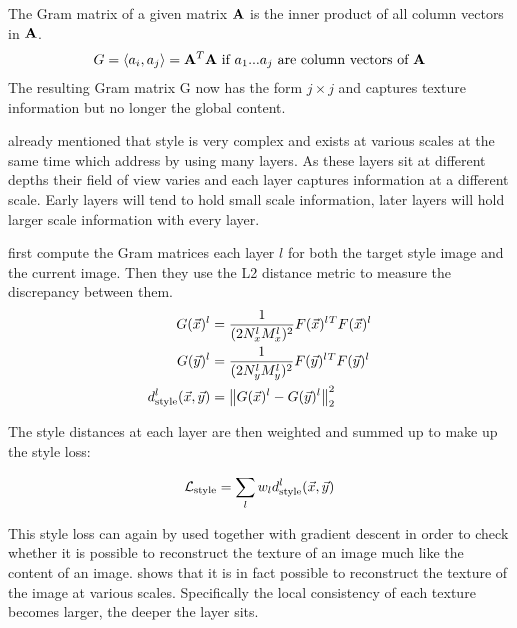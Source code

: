 The Gram matrix of a given matrix $\mathbf{A}$ is the inner product of all column vectors in $\mathbf{A}$.
\begin{align}
    G = \langle a_{i}, a_{j} \rangle = \mathbf{A}^T \mathbf{A} \text{ if $a_1$...$a_j$ are column vectors of $\mathbf{A}$}
\end{align}
The resulting Gram matrix G now has the form $j \times j$ and captures texture information but no longer the global content.

 already mentioned that style is very complex and exists at various scales at the same time which \citeauthor*{gatys} address by using many layers.
As these layers sit at different depths their field of view varies and each layer captures information at a different scale.
Early layers will tend to hold small scale information, later layers will hold larger scale information with every layer.

\citeauthor*{gatys} first compute the Gram matrices each layer $l$ for both the target style image and the current image.
Then they use the L2 distance metric to measure the discrepancy between them.
\begin{align}
    G(\vec{x})^l & = \frac{1}{(2 N_x^l M_x^l)^2} F(\vec{x})^l{}^T F(\vec{x})^l \\
    G(\vec{y})^l & = \frac{1}{(2 N_y^l M_y^l)^2} F(\vec{y})^l{}^T F(\vec{y})^l \\
    d_{\text{style}}^l(\vec{x}, \vec{y}) & = \left\lVert G(\vec{x})^l - G(\vec{y})^l\right\rVert^2_2 \\
\end{align}


The style distances at each layer are then weighted and summed up to make up the style loss:

\begin{align}
    \mathcal{L}_{\text{style}} = \sum_{l} w_l d_{\text{style}}^l(\vec{x}, \vec{y})
\end{align}

This style loss can again by used together with gradient descent in order to check whether it is possible to reconstruct the texture of an image much like the content of an image.
 shows that it is in fact possible to reconstruct the texture of the image at various scales.
Specifically the local consistency of each texture becomes larger, the deeper the layer sits.

